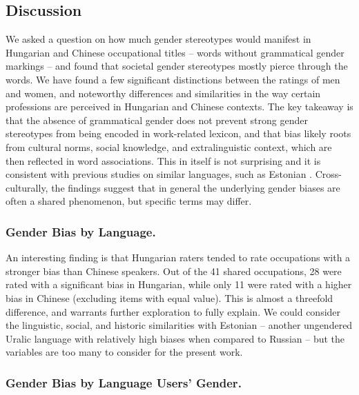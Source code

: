 \documentclass[runningheads]{llncs}
\begin{document}
\subsection{Discussion}\label{sec:discussion}

We asked a question on how much gender stereotypes would manifest in Hungarian and Chinese occupational titles -- words without grammatical gender markings -- and found that societal gender stereotypes mostly pierce through the words. We have found a few significant distinctions between the ratings of men and women, and noteworthy differences and similarities in the way certain professions are perceived in Hungarian and Chinese contexts. The key takeaway is that the absence of grammatical gender does not prevent strong gender stereotypes from being encoded in work-related lexicon, and that bias likely roots from cultural norms, social knowledge, and extralinguistic context, which are then reflected in word associations. This in itself is not surprising and it is consistent with previous studies on similar languages, such as Estonian \citep{kaukonen_2025_gender}. Cross-culturally, the findings suggest that in general the underlying gender biases are often a shared phenomenon, but specific terms may differ. 

\subsubsection{Gender Bias by Language.}

An interesting finding is that Hungarian raters tended to rate occupations with a stronger bias than Chinese speakers. Out of the 41 shared occupations, 28 were rated with a significant bias in Hungarian, while only 11 were rated with a higher bias in Chinese (excluding items with equal value). This is almost a threefold difference,
and warrants further exploration to fully explain. We could consider the linguistic, social, and historic similarities with Estonian -- another ungendered Uralic language with relatively high biases when compared to Russian \citep{kaukonen_2025_gender} -- but the variables are too many to consider for the present work.

\subsubsection{Gender Bias by Language Users' Gender.}
\end{document}

